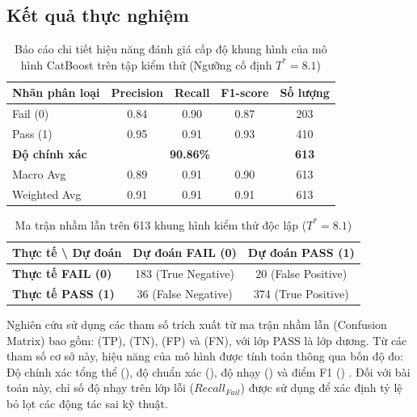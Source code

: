 \documentclass[10pt,conference,a4paper]{IEEEtran}
\begin{document}
\subsection{Kết quả thực nghiệm}

\begin{table}[!t]
    \centering
    \caption{Báo cáo chi tiết hiệu năng đánh giá cấp độ khung hình của mô hình CatBoost trên tập kiểm thử (Ngưỡng cố định $T^* = 8.1$)}
    \label{tab:frame_classification_report}
    \setlength{\tabcolsep}{10pt}
    \renewcommand{\arraystretch}{1.15}
    \begin{tabular}{lcccc}
        \hline
        \textbf{Nhãn phân loại} & \textbf{Precision} & \textbf{Recall} & \textbf{F1-score} & \textbf{Số lượng} \\
        \hline
        Fail (0)                & 0.84 & 0.90 & 0.87 & 203 \\
        Pass (1)                & 0.95 & 0.91 & 0.93 & 410 \\
        \hline
        \textbf{Độ chính xác} & \multicolumn{3}{c}{\textbf{90.86\%}} & \textbf{613} \\
        Macro Avg               & 0.89 & 0.91 & 0.90 & 613 \\
        Weighted Avg            & 0.91 & 0.91 & 0.91 & 613 \\
        \hline
    \end{tabular}
\end{table}

\begin{table}[!t]
    \centering
    \caption{Ma trận nhầm lẫn trên 613 khung hình kiểm thử độc lập ($T^*=8.1$)}
    \label{tab:confusion_matrix}
    \setlength{\tabcolsep}{10pt}
    \renewcommand{\arraystretch}{1.2}
    \begin{tabular}{lcc}
        \hline
        \textbf{Thực tế \textbackslash{} Dự đoán} & \textbf{Dự đoán FAIL (0)} & \textbf{Dự đoán PASS (1)} \\
        \hline
        \textbf{Thực tế FAIL (0)}  & 183 (True Negative)       & 20 (False Positive)       \\
        \textbf{Thực tế PASS (1)}  & 36 (False Negative)       & 374 (True Positive)       \\
        \hline
    \end{tabular}
\end{table}

Nghiên cứu sử dụng các tham số trích xuất từ ma trận nhầm lẫn (Confusion Matrix) bao gồm:  (TP),  (TN),  (FP) và  (FN), với lớp PASS là lớp dương. Từ các tham số cơ sở này, hiệu năng của mô hình được tính toán thông qua bốn độ đo: Độ chính xác tổng thể (), độ chuẩn xác (), độ nhạy () và điểm F1 () \cite{SOKOLOVA2009427}. Đối với bài toán này, chỉ số độ nhạy trên lớp lỗi ($Recall_{Fail}$) được sử dụng để xác định tỷ lệ bỏ lọt các động tác sai kỹ thuật.
\end{document}
